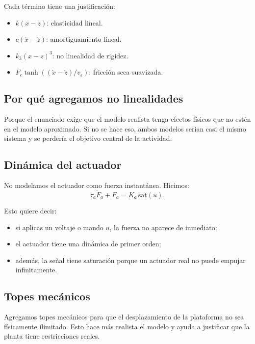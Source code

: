 \documentclass[11pt]{article}
\begin{document}
Cada t\'ermino tiene una justificaci\'on:

\begin{itemize}[leftmargin=1.2cm]
\item $k(x-z)$: elasticidad lineal.
\item $c(\dot{x}-\dot{z})$: amortiguamiento lineal.
\item $k_3(x-z)^3$: no linealidad de rigidez.
\item $F_c\tanh((\dot{x}-\dot{z})/v_\varepsilon)$: fricci\'on seca suavizada.
\end{itemize}

\subsection{Por qu\'e agregamos no linealidades}

Porque el enunciado exige que el modelo realista tenga efectos f\'isicos que no est\'en en el modelo aproximado. Si no se hace eso, ambos modelos ser\'ian casi el mismo sistema y se perder\'ia el objetivo central de la actividad.

\subsection{Din\'amica del actuador}

No modelamos el actuador como fuerza instant\'anea. Hicimos:
\begin{equation}
\tau_a\dot{F}_a + F_a = K_a\,\mathrm{sat}(u).
\label{eq:actuador}
\end{equation}

Esto quiere decir:

\begin{itemize}[leftmargin=1.2cm]
\item si aplicas un voltaje o mando $u$, la fuerza no aparece de inmediato;
\item el actuador tiene una din\'amica de primer orden;
\item adem\'as, la se\~nal tiene saturaci\'on porque un actuador real no puede empujar infinitamente.
\end{itemize}

\subsection{Topes mec\'anicos}

Agregamos topes mec\'anicos para que el desplazamiento de la plataforma no sea f\'isicamente ilimitado. Esto hace m\'as realista el modelo y ayuda a justificar que la planta tiene restricciones reales.
\end{document}
